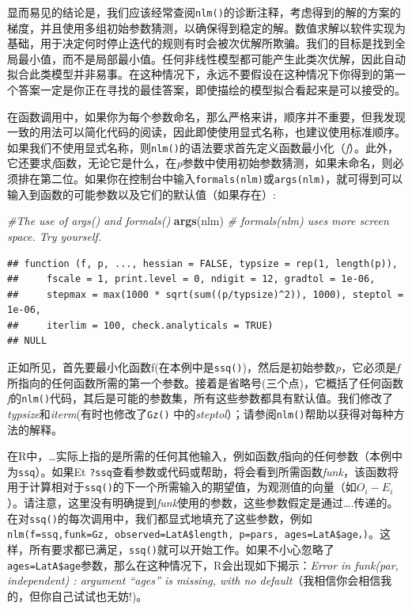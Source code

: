 \documentclass[
  lang=cn,
  11pt,
  scheme=chinese,
  chinesefont=nofont,
  citestyle=gb7714-2015,
  bibstyle=gb7714-2015]{elegantbook}
\newenvironment{Shaded}{\begin{snugshade}}{\end{snugshade}}
\newcommand{\CommentTok}[1]{\textcolor[rgb]{0.56,0.35,0.01}{\textit{#1}}}
\newcommand{\FunctionTok}[1]{\textcolor[rgb]{0.13,0.29,0.53}{\textbf{#1}}}
\newcommand{\NormalTok}[1]{#1}
\begin{document}
显而易见的结论是，我们应该经常查阅\texttt{nlm()}的诊断注释，考虑得到的解的方案的梯度，并且使用多组初始参数猜测，以确保得到稳定的解。数值求解以软件实现为基础，用于决定何时停止迭代的规则有时会被次优解所欺骗。我们的目标是找到全局最小值，而不是局部最小值。任何非线性模型都可能产生此类次优解，因此自动拟合此类模型并非易事。在这种情况下，永远不要假设在这种情况下你得到的第一个答案一定是你正在寻找的最佳答案，即使描绘的模型拟合看起来是可以接受的。

在函数调用中，如果你为每个参数命名，那么严格来讲，顺序并不重要，但我发现一致的用法可以简化代码的阅读，因此即使使用显式名称，也建议使用标准顺序。如果我们不使用显式名称，则\texttt{nlm()}的语法要求首先定义函数最小化（\emph{f}）。此外，它还要求\emph{f}函数，无论它是什么，在\emph{p}参数中使用初始参数猜测，如果未命名，则必须排在第二位。如果你在控制台中输入\texttt{formals(nlm)}或\texttt{args(nlm)}，就可得到可以输入到函数的可能参数以及它们的默认值（如果存在）:

\begin{Shaded}
\begin{Highlighting}[]
 \CommentTok{\#The use of args() and formals()   }
\FunctionTok{args}\NormalTok{(nlm) }\CommentTok{\# formals(nlm) uses more screen space. Try yourself.  }
\end{Highlighting}
\end{Shaded}

\begin{verbatim}
## function (f, p, ..., hessian = FALSE, typsize = rep(1, length(p)), 
##     fscale = 1, print.level = 0, ndigit = 12, gradtol = 1e-06, 
##     stepmax = max(1000 * sqrt(sum((p/typsize)^2)), 1000), steptol = 1e-06, 
##     iterlim = 100, check.analyticals = TRUE) 
## NULL
\end{verbatim}

正如所见，首先要最小化函数f(在本例中是\texttt{ssq()})，然后是初始参数\emph{p}，它必须是\emph{f}所指向的任何函数所需的第一个参数。接着是省略号(三个点)，它概括了任何函数\emph{f}的\texttt{nlm()}代码，其后是可能的参数集，所有这些参数都具有默认值。我们修改了\emph{typsize}和\emph{iterm}(有时也修改了\texttt{Gz()} 中的\emph{steptol}）；请参阅\texttt{nlm()}帮助以获得对每种方法的解释。

在R中，\ldots 实际上指的是所需的任何其他输入，例如函数\emph{f}指向的任何参数（本例中为\texttt{ssq}）。如果Et \texttt{?ssq}查看参数或代码或帮助，将会看到所需函数\emph{funk}，该函数将用于计算相对于\texttt{ssq()}的下一个所需输入的期望值，为观测值的向量（如\(O_i-E_i\)）。请注意，这里没有明确提到\emph{funk}使用的参数，这些参数假定是通过\ldots.传递的。在对\texttt{ssq()}的每次调用中，我们都显式地填充了这些参数，例如\texttt{nlm(f=ssq,funk=Gz,\ observed=LatA\$length,\ p=pars,\ ages=LatA\$age，)}。这样，所有要求都已满足，\texttt{ssq()}就可以开始工作。如果不小心忽略了\texttt{ages=LatA\$age}参数，那么在这种情况下，R会出现如下揭示：\emph{Error in funk(par, independent) : argument ``ages'' is missing, with no default}（我相信你会相信我的，但你自己试试也无妨!)。
\end{document}
